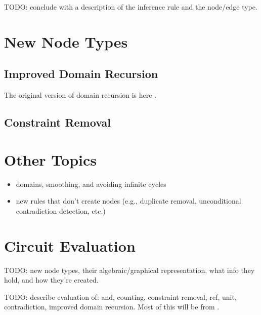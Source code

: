 \documentclass{article}
\theoremstyle{definition}
\begin{document}
TODO: conclude with a description of the inference rule and the node/edge type.

\section{New Node Types}

\subsection{Improved Domain Recursion}

The original version of domain recursion is here \cite{DBLP:conf/nips/Broeck11}.

\subsection{Constraint Removal}

\section{Other Topics}

\begin{itemize}
\item domains, smoothing, and avoiding infinite cycles
\item new rules that don't create nodes (e.g., duplicate removal, unconditional contradiction detection, etc.)
\end{itemize}

\section{Circuit Evaluation}

TODO: new node types, their algebraic/graphical representation, what info they hold, and how they're created.

TODO: describe evaluation of: and, counting, constraint removal, ref, unit, contradiction, improved domain recursion. Most of this will be from \cite{DBLP:conf/ijcai/BroeckTMDR11}.



\end{document}
